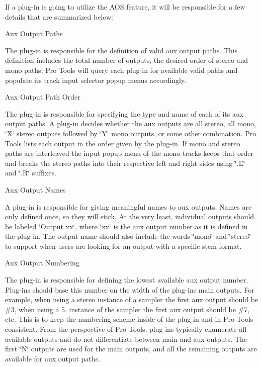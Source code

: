 If a plug-\/in is going to utilize the A\+OS feature, it will be responsible for a few details that are summarized below\+: 
\begin{DoxyItemize}
\item  Aux Output Paths

The plug-\/in is responsible for the definition of valid aux output paths. This definition includes the total number of outputs, the desired order of stereo and mono paths. Pro Tools will query each plug-\/in for available valid paths and populate its track input selector popup menus accordingly.


\item  Aux Output Path Order

The plug-\/in is responsible for specifying the type and name of each of its aux output paths. A plug-\/in decides whether the aux outputs are all stereo, all mono, \char`\"{}\+X\char`\"{} stereo outputs followed by \char`\"{}\+Y\char`\"{} mono outputs, or some other combination. Pro Tools lists each output in the order given by the plug-\/in. If mono and stereo paths are interleaved the input popup menu of the mono tracks keeps that order and breaks the stereo paths into their respective left and right sides using \char`\"{}.\+L\char`\"{} and \char`\"{}.\+R\char`\"{} suffixes.


\item  Aux Output Names

A plug-\/in is responsible for giving meaningful names to aux outputs. Names are only defined once, so they will stick. At the very least, individual outputs should be labeled \char`\"{}\+Output xx\char`\"{}, where \char`\"{}xx\char`\"{} is the aux output number as it is defined in the plug-\/in. The output name should also include the words \char`\"{}mono\char`\"{} and \char`\"{}stereo\char`\"{} to support when users are looking for an output with a specific stem format.


\item  Aux Output Numbering

The plug-\/in is responsible for defining the lowest available aux output number. Plug-\/ins should base this number on the width of the plug-\/in\textquotesingle{}s main outputs. For example, when using a stereo instance of a sampler the first aux output should be \#3, when using a 5. instance of the sampler the first aux output should be \#7, etc. This is to keep the numbering scheme inside of the plug-\/in and in Pro Tools consistent. From the perspective of Pro Tools, plug-\/ins typically enumerate all available outputs and do not differentiate between main and aux outputs. The first \char`\"{}\+N\char`\"{} outputs are used for the main outputs, and all the remaining outputs are available for aux output paths.



\end{DoxyItemize}
